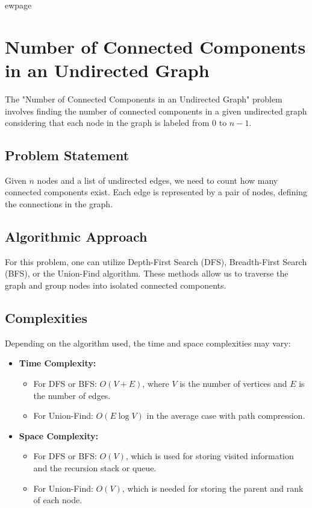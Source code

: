 
ewpage

\chapter{Number of Connected Components in an Undirected Graph}
\label{chap:Number_of_Connected_Components_in_an_Undirected_Graph}
The "Number of Connected Components in an Undirected Graph" problem involves finding the number of connected components in a given undirected graph considering that each node in the graph is labeled from 0 to \(n - 1\).

\section*{Problem Statement}
Given \(n\) nodes and a list of undirected edges, we need to count how many connected components exist. Each edge is represented by a pair of nodes, defining the connections in the graph.

\section*{Algorithmic Approach}
For this problem, one can utilize Depth-First Search (DFS), Breadth-First Search (BFS), or the Union-Find algorithm. These methods allow us to traverse the graph and group nodes into isolated connected components.

\section*{Complexities}
Depending on the algorithm used, the time and space complexities may vary: 

\begin{itemize}
	\item \textbf{Time Complexity:} 
      \begin{itemize}
        \item For DFS or BFS: \(O(V + E)\), where \(V\) is the number of vertices and \(E\) is the number of edges.
        \item For Union-Find: \(O(E \log V)\) in the average case with path compression.
      \end{itemize}
    \item \textbf{Space Complexity:} 
      \begin{itemize}
        \item For DFS or BFS: \(O(V)\), which is used for storing visited information and the recursion stack or queue.
        \item For Union-Find: \(O(V)\), which is needed for storing the parent and rank of each node.
      \end{itemize}
\end{itemize}


